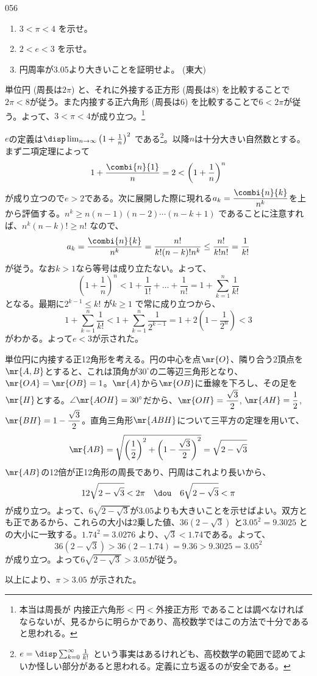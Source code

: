 \begin{thm}{056}{}{}
 \begin{enumerate}
  \item $3<\pi<4$ を示せ。
  \item $2<e<3$ を示せ。 
  \item 円周率が3.05より大きいことを証明せよ。  (東大)
 \end{enumerate}
\end{thm}

単位円 (周長は$2\pi$) と、それに外接する正方形 (周長は8) を比較することで$2\pi<8$が従う。また内接する正六角形 (周長は6) を比較することで$6<2\pi$が従う。よって、$3<\pi<4$が成り立つ。\footnote{本当は周長が 内接正六角形$<$円$<$外接正方形 であることは調べなければならないが、見るからに明らかであり、高校数学ではこの方法で十分であると思われる。}

$e$の定義は$\disp \lim_{n\to\infty} \left(1+\frac{1}{n}\right)^2$ である\footnote{$e=\disp \sum_{k=0}^\infty\frac{1}{k!}$ という事実はあるけれども、高校数学の範囲で認めてよいか怪しい部分があると思われる。定義に立ち返るのが安全である。}。以降$n$は十分大きい自然数とする。まず二項定理によって
\[ 1+\frac{\combi{n}{1}}{n}=2<\left(1+\frac{1}{n}\right)^n \]
が成り立つので$e>2$である。次に展開した際に現れる$a_k=\dfrac{\combi{n}{k}}{n^k}$を上から評価する。$n^k\ge n(n-1)(n-2)\cdots(n-k+1)$ であることに注意すれば、$n^k(n-k)!\ge n!$ なので、
\[ a_k=\frac{\combi{n}{k}}{n^k}=\frac{n!}{k!(n-k)!n^k}\le \frac{n!}{k!n!}=\frac{1}{k!} \]
が従う。なお$k>1$なら等号は成り立たない。よって、
\[ \left(1+\frac{1}{n}\right)^n<1+\frac{1}{1!}+\dots +\frac{1}{n!}=1+\sum_{k=1}^n \frac{1}{k!} \]
となる。最期に$2^{k-1}\le k!$ が$k\ge 1$ で常に成り立つから、
\[ 1+\sum_{k=1}^n\frac{1}{k!}<1+\sum_{k=1}^n \frac{1}{2^{k-1}}=1+2\left(1-\frac{1}{2^n}\right) < 3 \]
がわかる。よって$e<3$が示された。

単位円に内接する正12角形を考える。円の中心を点$\mr{O}$、隣り合う2頂点を$\mr{A,B}$とすると、これは頂角が$30^\circ$の二等辺三角形となり、$\mr{OA}=\mr{OB}=1$。$\mr{A}$から$\mr{OB}$に垂線を下ろし、その足を$\mr{H}$とする。$\angle\mr{AOH}=30^\circ$だから、$\mr{OH}=\dfrac{\sqrt{3}}{2}$, $\mr{AH}=\dfrac{1}{2}$, $\mr{BH}=1-\dfrac{\sqrt{3}}{2}$。直角三角形$\mr{ABH}$について三平方の定理を用いて、
\[ \mr{AB}=\sqrt{\left(\frac{1}{2}\right)^2+\left(1-\frac{\sqrt{3}}{2}\right)^2}=\sqrt{2-\sqrt{3}} \]
$\mr{AB}$の12倍が正12角形の周長であり、円周はこれより長いから、
\[ 12\sqrt{2-\sqrt{3}} < 2\pi \quad\dou\quad 6\sqrt{2-\sqrt{3}} < \pi \]
が成り立つ。よって、$6\sqrt{2-\sqrt{3}}$が$3.05$よりも大きいことを示せばよい。双方とも正であるから、これらの大小は2乗した値、$36(2-\sqrt{3})$ と$3.05^2=9.3025$ との大小に一致する。$1.74^2=3.0276$ より、$\sqrt{3}<1.74$である。よって、
\[ 36(2-\sqrt{3}) > 36(2-1.74)=9.36>9.3025=3.05^2 \]
が成り立つ。よって$6\sqrt{2-\sqrt{3}}>3.05$が従う。

以上により、$\pi > 3.05$ が示された。
